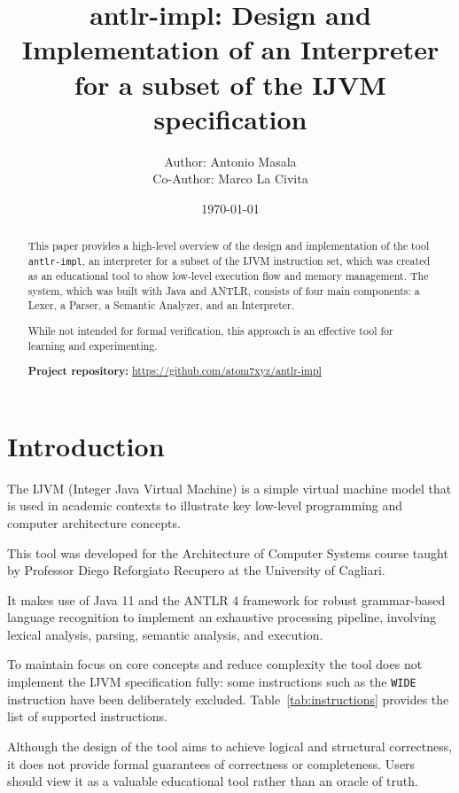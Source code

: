 \documentclass[11pt]{article}
\title{antlr-impl: Design and Implementation of an Interpreter for a subset of the IJVM specification}
\author{
    Author: Antonio Masala\\
    Co-Author: Marco La Civita
}
\date{\today}
\begin{document}
\maketitle

\begin{abstract}
This paper provides a high-level overview of the design and implementation of the tool \texttt{antlr-impl}, an interpreter for a subset of the IJVM instruction set, which was created as an educational tool to show low-level execution flow and memory management. 
The system, which was built with Java and ANTLR, consists of four main components: a Lexer, a Parser, a Semantic Analyzer, and an Interpreter. 

While not intended for formal verification, this approach is an effective tool for learning and experimenting.

\vspace{2em}
\noindent
\textbf{Project repository:} \url{https://github.com/atom7xyz/antlr-impl}
\end{abstract}

\newpage

\section{Introduction}
The IJVM (Integer Java Virtual Machine) is a simple virtual machine model that is used in academic contexts to illustrate key low-level programming and computer architecture concepts.  

This tool was developed for the Architecture of Computer Systems course taught by Professor Diego Reforgiato Recupero at the University of Cagliari. 

It makes use of Java 11 and the ANTLR 4 framework for robust grammar-based language recognition to implement an exhaustive processing pipeline, involving lexical analysis, parsing, semantic analysis, and execution.

To maintain focus on core concepts and reduce complexity the tool does not implement the IJVM specification fully: some instructions such as the  \texttt{WIDE} instruction have been deliberately excluded. Table~\ref{tab:instructions} provides the list of supported instructions.

Although the design of the tool aims to achieve logical and structural correctness, it does not provide formal guarantees of correctness or completeness. Users should view it as a valuable educational tool rather than an oracle of truth.
\end{document}
